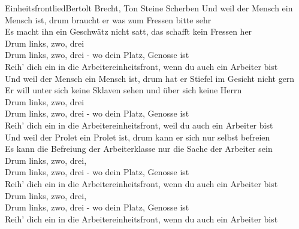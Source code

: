
\begin{lied}{Einheitsfrontlied}{Bertolt Brecht, Ton Steine Scherben}
Und weil der Mensch ein Mensch ist, drum braucht er was zum Fressen bitte sehr\\
Es macht ihn ein Geschwätz nicht satt, das schafft kein Fressen her\\

Drum links, zwo, drei\\
Drum links, zwo, drei - wo dein Platz, Genosse ist\\
Reih' dich ein in die Arbeitereinheitsfront, wenn du auch ein Arbeiter bist\\

Und weil der Mensch ein Mensch ist, drum hat er Stiefel im Gesicht nicht gern\\
Er will unter sich keine Sklaven sehen und über sich keine Herrn\\

Drum links, zwo, drei\\
Drum links, zwo, drei - wo dein Platz, Genosse ist\\
Reih' dich ein in die Arbeitereinheitsfront, weil du auch ein Arbeiter bist\\

Und weil der Prolet ein Prolet ist, drum kann er sich nur selbst befreien\\
Es kann die Befreiung der Arbeiterklasse nur die Sache der Arbeiter sein\\

Drum links, zwo, drei,\\
Drum links, zwo, drei - wo dein Platz, Genosse ist\\
Reih' dich ein in die Arbeitereinheitsfront, wenn du auch ein Arbeiter bist\\

Drum links, zwo, drei,\\
Drum links, zwo, drei - wo dein Platz, Genosse ist\\
Reih' dich ein in die Arbeitereinheitsfront, wenn du auch ein Arbeiter bist\\
\end{lied}